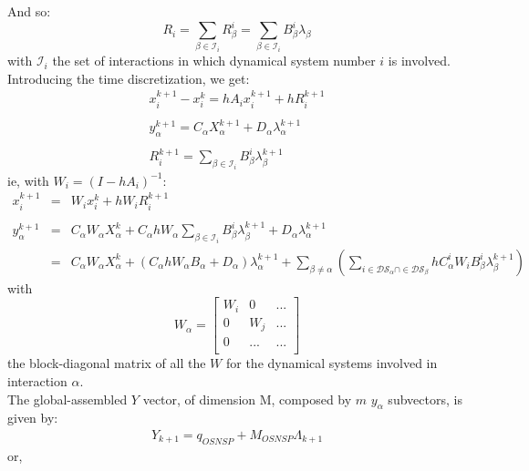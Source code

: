 \documentclass[10pt]{report}
\begin{document}
And so:
\begin{equation}
R_i = \sum_{\beta\in\mathcal{I}_i}R_{\beta}^i=\sum_{\beta\in\mathcal{I}_i}B^i_{\beta} \lambda_{\beta}
\end{equation}
with $\mathcal{I}_i$ the set of interactions in which dynamical system number $i$ is involved. \\
Introducing the time discretization, we get:
\begin{eqnarray}
x_i^{k+1}-x_i^k = h A_i x_i^{k+1} + h R_i^{k+1}  \\
\nonumber\\
y_{\alpha}^{k+1} = C_{\alpha}X_{\alpha}^{k+1} + D_{\alpha}\lambda_{\alpha}^{k+1}\\
\nonumber\\
R_i^{k+1} = \sum_{\beta\in\mathcal{I}_i}B^i_{\beta} \lambda_{\beta}^{k+1}
\end{eqnarray}
ie, with $W_i = (I-h A_i)^{-1}$:
\begin{eqnarray}
x_i^{k+1}&=& W_i x_i^{k} + hW_i R_i^{k+1}  \\
\nonumber\\
y_{\alpha}^{k+1} &=& C_{\alpha}W_{\alpha} X_{\alpha}^{k} + C_{\alpha}hW_{\alpha}\sum_{\beta\in\mathcal{I}_i}B^i_{\beta} \lambda_{\beta}^{k+1} + D_{\alpha}\lambda_{\alpha}^{k+1} \\
&=& C_{\alpha}W_{\alpha} X_{\alpha}^{k} + (C_{\alpha}hW_{\alpha}B_{\alpha} + D_{\alpha}) \lambda_{\alpha}^{k+1} + \sum_{\beta\neq\alpha}(\sum_{i\in\mathcal{DS}_{\alpha}\cap\in\mathcal{DS}_{\beta}} hC_{\alpha}^iW_i B^i_{\beta} \lambda_{\beta}^{k+1})
\end{eqnarray}
with
\begin{equation}\label{Walpha}
W_{\alpha}=\left[\begin{array}{ccc}
W_i &  0   & ... \\
0   &  W_j & ...\\
0  & ... & ... \\
\end{array}\right]
\end{equation}
the block-diagonal matrix of all the $W$ for the dynamical systems involved in interaction $\alpha$.\\
The global-assembled $Y$ vector, of dimension M, composed by $m$ $y_{\alpha}$ subvectors, is given by:
\begin{eqnarray}
Y_{k+1} = q_{OSNSP} + M_{OSNSP}\Lambda_{k+1}
\end{eqnarray}
or,
\end{document}
